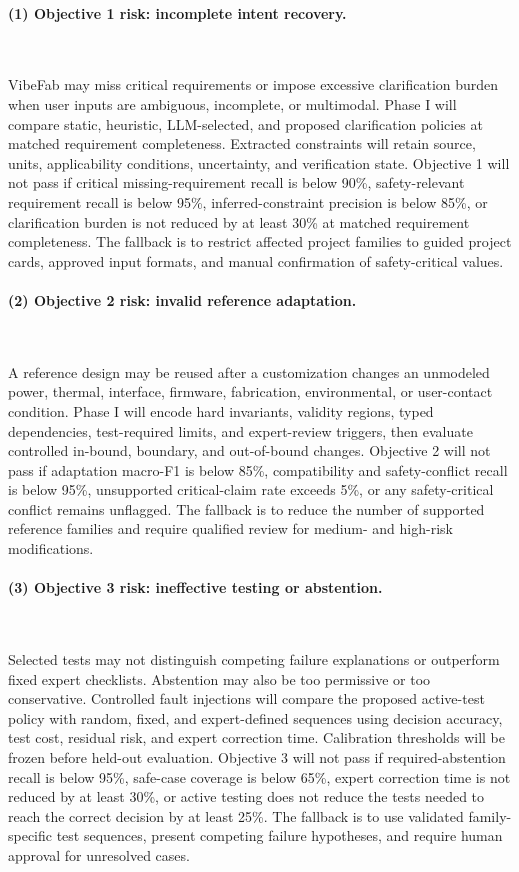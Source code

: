 \paragraph{(1) Objective 1 risk: incomplete intent recovery.}~{}

VibeFab may miss critical requirements or impose excessive clarification burden when user inputs are ambiguous, incomplete, or multimodal.
Phase I will compare static, heuristic, LLM-selected, and proposed clarification policies at matched requirement completeness. Extracted constraints will retain source, units, applicability conditions, uncertainty, and verification state. Objective 1 will not pass if critical missing-requirement recall is below
90\%, safety-relevant requirement recall is below 95\%, inferred-constraint
precision is below 85\%, or clarification burden is not reduced by at least
30\% at matched requirement completeness. 
The fallback is to restrict affected project families to guided project cards, approved input formats, and manual confirmation of safety-critical values.

\paragraph{(2) Objective 2 risk: invalid reference adaptation.}~{}

A reference design may be reused after a customization changes an
unmodeled power, thermal, interface, firmware, fabrication, environmental,
or user-contact condition. Phase I will encode hard invariants, validity
regions, typed dependencies, test-required limits, and expert-review
triggers, then evaluate controlled in-bound, boundary, and out-of-bound
changes. Objective 2 will not pass if adaptation macro-F1 is below 85\%,
compatibility and safety-conflict recall is below 95\%, unsupported
critical-claim rate exceeds 5\%, or any safety-critical conflict remains
unflagged. The fallback is to reduce
the number of supported reference families and require qualified review
for medium- and high-risk modifications.

\paragraph{(3) Objective 3 risk: ineffective testing or abstention.}~{}

Selected tests may not distinguish competing failure explanations or
outperform fixed expert checklists. Abstention may also be too permissive
or too conservative. Controlled fault injections will compare the
proposed active-test policy with random, fixed, and expert-defined
sequences using decision accuracy, test cost, residual risk, and expert
correction time. Calibration thresholds will be frozen before held-out
evaluation. Objective 3 will not pass if required-abstention recall is below 95\%,
safe-case coverage is below 65\%, expert correction time is not reduced by
at least 30\%, or active testing does not reduce the tests needed to reach
the correct decision by at least 25\%. The fallback is to use validated family-specific
test sequences, present competing failure hypotheses, and require human
approval for unresolved cases.

